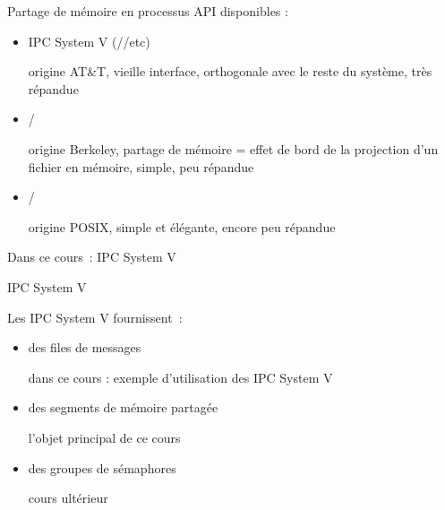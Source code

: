 \begin {frame} {Partage de mémoire en processus}
    API disponibles :

    \begin {itemize}
	\item IPC System V (//etc)

	    \implique origine AT\&T, vieille interface, orthogonale avec
		le reste du système, très répandue

	\item {}/

	    \implique origine Berkeley, partage de mémoire = effet de
		bord de la projection d'un fichier en mémoire, simple,
		peu répandue

	\item {}/

	    \implique origine POSIX, simple et élégante, encore peu
		répandue

    \end {itemize}

    \vspace* {3mm}

    Dans ce cours~: IPC System V

\end {frame}

\begin {frame} {IPC System V}

    Les IPC System V fournissent~:

    \begin {itemize}
	\item des files de messages

	    \implique dans ce cours : exemple d'utilisation des IPC
	    System V

	\item des segments de mémoire partagée

	    \implique l'objet principal de ce cours

	\item des groupes de sémaphores

	    \implique cours ultérieur

    \end {itemize}

\end {frame}

